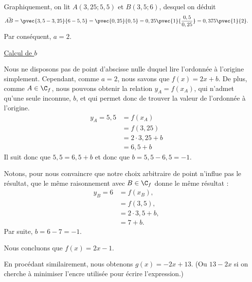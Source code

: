 {	Graphiquement, on lit $A(3,25 ; 5,5)$ et $B(3,5 ; 6)$, desquel on déduit
		\[ \vec{AB} = \pvec{3,5-3,25}{6-5,5} = \pvec{0,25}{0,5} = 0,25 \pvec{1}{\frac{0,5}{0,25}} = 0,375 \pvec{1}{2}. \]
	Par conséquent, $a = 2$.
	
	\underline{Calcul de $b$}
	
	Nous ne disposons pas de point d'abscisse nulle duquel lire l'ordonnée à l'origine simplement.
	Cependant, comme $a =2$, nous savons que $f(x) = 2x+b$.
	De plus, comme $A\in\C_f$, nous pouvons obtenir la relation $y_A = f(x_A)$, qui n'admet qu'une seule inconnue, $b$, et qui permet donc de trouver la valeur de l'ordonnée à l'origine.
	\begin{align*}
		y_A = 5,5 &= f(x_A) \\
					&= f(3,25) \\
					&= 2\cdot3,25 + b \\
					&= 6,5 + b
	\end{align*}
	Il suit donc que $5,5 = 6,5+b$ et donc que $b = 5,5-6,5 = -1$.
	
	Notons, pour nous convaincre que notre choix arbitraire de point n'influe pas le résultat, que le même raisonnement avec $B\in\C_f$ donne le même résultat :
	\begin{align*}
		y_B = 6 &= f(x_B), \\
					&= f(3,5), \\
					&= 2\cdot3,5 + b, \\
					&= 7 + b.
	\end{align*}
	Par suite, $b = 6-7 = -1$.
	
	Nous concluons que $f(x) = 2x - 1$.
	
	
	En procédant similairement, nous obtenons $g(x) = -2x + 13$. (Ou $13-2x$ si on cherche à minimiser l'encre utilisée pour écrire l'expression.)
}



